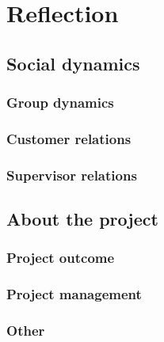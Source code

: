\chapter{Reflection} 
\label{ch:reflection}


\section{Social dynamics}

\subsection{Group dynamics}
\subsection{Customer relations}
\subsection{Supervisor relations}

\section{About the project}

\subsection{Project outcome}
\subsection{Project management}
\subsection{Other}
